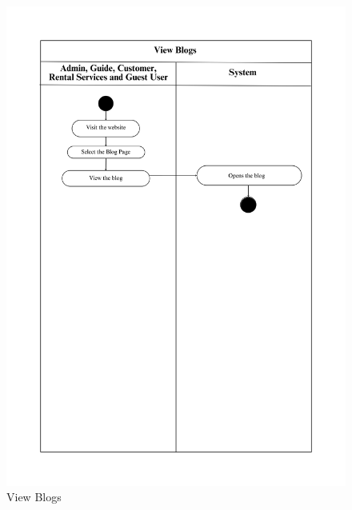\begin{figure}[h]
    \centering
    \includegraphics[width=1\textwidth]{Images/Activity Diagrams/11 View Blogs.png}
    \caption{View Blogs}
    \label{fig:activity-view-blog}
\end{figure}

